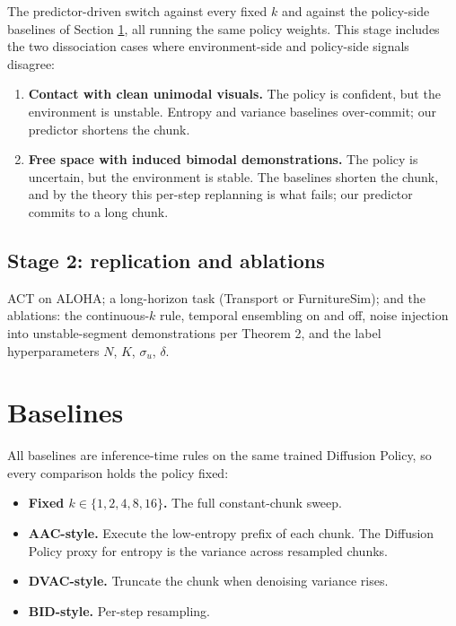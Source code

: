 \documentclass[11pt]{article}
\begin{document}
The predictor-driven switch against every fixed $k$ and against the policy-side
baselines of Section \ref{sec:baselines}, all running the same policy weights. This
stage includes the two dissociation cases where environment-side and policy-side
signals disagree:

\begin{enumerate}[leftmargin=2em]
  \item \textbf{Contact with clean unimodal visuals.} The policy is confident, but the
        environment is unstable. Entropy and variance baselines over-commit; our
        predictor shortens the chunk.
  \item \textbf{Free space with induced bimodal demonstrations.} The policy is
        uncertain, but the environment is stable. The baselines shorten the chunk, and
        by the theory this per-step replanning is what fails; our predictor commits to
        a long chunk.
\end{enumerate}

\subsection{Stage 2: replication and ablations}

ACT on ALOHA; a long-horizon task (Transport or FurnitureSim); and the ablations:
the continuous-$k$ rule, temporal ensembling on and off, noise injection into
unstable-segment demonstrations per Theorem 2, and the label hyperparameters
$N$, $K$, $\sigma_u$, $\delta$.

\section{Baselines}
\label{sec:baselines}

All baselines are inference-time rules on the same trained Diffusion Policy, so every
comparison holds the policy fixed:

\begin{itemize}[leftmargin=2em]
  \item \textbf{Fixed $k \in \{1, 2, 4, 8, 16\}$.} The full constant-chunk sweep.
  \item \textbf{AAC-style.} Execute the low-entropy prefix of each chunk. The Diffusion
        Policy proxy for entropy is the variance across resampled chunks.
  \item \textbf{DVAC-style.} Truncate the chunk when denoising variance rises.
  \item \textbf{BID-style.} Per-step resampling.
\end{itemize}
\end{document}
